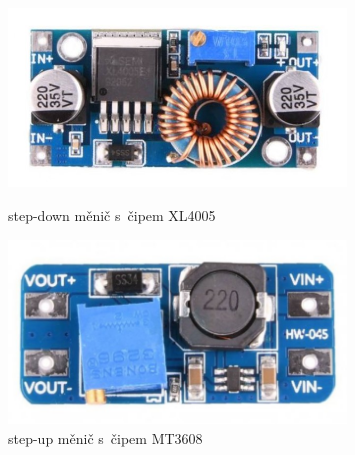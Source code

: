 \begin{figure}[htb]
  \centering
  \begin{minipage}{0.45\textwidth}
    \centering
  \includegraphics[width=0.8\textwidth]{img/XL4005.jpg}
  \caption{\label{fig:XL4005} step-down měnič  s~čipem XL4005~\cite{laskakit-XL4005}}
  \end{minipage}\hfill
  \begin{minipage}{0.45\textwidth}
    \centering
  \includegraphics[width=0.8\textwidth]{img/MT3608.jpg}
  \caption{\label{fig:MT3608} step-up měnič  s~čipem MT3608~\cite{laskakit-MT3608}}
  \end{minipage}
\end{figure}
